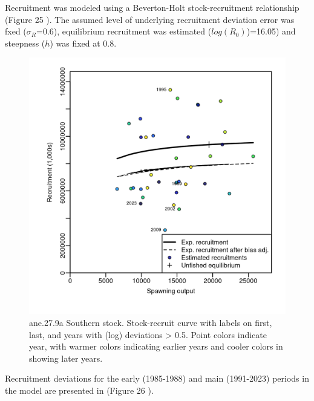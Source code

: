 \documentclass[
]{article}
\begin{document}
Recruitment was modeled using a Beverton-Holt stock-recruitment
relationship (Figure 25 ). The assumed level of underlying recruitment
deviation error was fxed (\(\sigma_R\)=0.6), equilibrium recruitment was
estimated (\(log(R_0)\))=16.05) and steepness (\(h\)) was fixed at 0.8.

\begin{figure}[H]

{\centering \includegraphics[width=0.95\linewidth]{report/run/S1.0_4FLEETS_SelECO_RecIndex_Mnewfix/fig_stock-recluta} 

}

\caption{ane.27.9a Southern stock. Stock-recruit curve with labels on first, last, and years with (log) deviations > 0.5. Point colors indicate year, with warmer colors indicating earlier years and cooler colors in showing later years.}\label{fig:unnamed-chunk-57}
\end{figure}

Recruitment deviations for the early (1985-1988) and main (1991-2023)
periods in the model are presented in (Figure 26 ).
\end{document}
